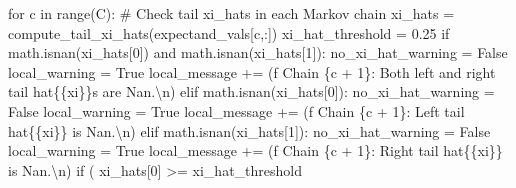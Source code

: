 \documentclass[
  letterpaper,
  DIV=11,
  numbers=noendperiod]{scrartcl}
\newenvironment{Shaded}{\begin{snugshade}}{\end{snugshade}}
\newcommand{\BuiltInTok}[1]{\textcolor[rgb]{0.00,0.23,0.31}{#1}}
\newcommand{\CharTok}[1]{\textcolor[rgb]{0.13,0.47,0.30}{#1}}
\newcommand{\CommentTok}[1]{\textcolor[rgb]{0.37,0.37,0.37}{#1}}
\newcommand{\ControlFlowTok}[1]{\textcolor[rgb]{0.00,0.23,0.31}{#1}}
\newcommand{\DecValTok}[1]{\textcolor[rgb]{0.68,0.00,0.00}{#1}}
\newcommand{\FloatTok}[1]{\textcolor[rgb]{0.68,0.00,0.00}{#1}}
\newcommand{\KeywordTok}[1]{\textcolor[rgb]{0.00,0.23,0.31}{#1}}
\newcommand{\NormalTok}[1]{\textcolor[rgb]{0.00,0.23,0.31}{#1}}
\newcommand{\OperatorTok}[1]{\textcolor[rgb]{0.37,0.37,0.37}{#1}}
\newcommand{\SpecialCharTok}[1]{\textcolor[rgb]{0.37,0.37,0.37}{#1}}
\newcommand{\SpecialStringTok}[1]{\textcolor[rgb]{0.13,0.47,0.30}{#1}}
\newcommand{\StringTok}[1]{\textcolor[rgb]{0.13,0.47,0.30}{#1}}
\newcommand{\VariableTok}[1]{\textcolor[rgb]{0.07,0.07,0.07}{#1}}
\begin{document}
\begin{Shaded}
\begin{Highlighting}[]
    \ControlFlowTok{for}\NormalTok{ c }\KeywordTok{in} \BuiltInTok{range}\NormalTok{(C):}
      \CommentTok{\# Check tail xi\_hats in each Markov chain}
\NormalTok{      xi\_hats }\OperatorTok{=}\NormalTok{ compute\_tail\_xi\_hats(expectand\_vals[c,:])}
\NormalTok{      xi\_hat\_threshold }\OperatorTok{=} \FloatTok{0.25}
      \ControlFlowTok{if}\NormalTok{ math.isnan(xi\_hats[}\DecValTok{0}\NormalTok{]) }\KeywordTok{and}\NormalTok{ math.isnan(xi\_hats[}\DecValTok{1}\NormalTok{]):}
\NormalTok{        no\_xi\_hat\_warning }\OperatorTok{=} \VariableTok{False}
\NormalTok{        local\_warning }\OperatorTok{=} \VariableTok{True}
\NormalTok{        local\_message }\OperatorTok{+=}\NormalTok{ (}\SpecialStringTok{f\textquotesingle{}  Chain }\SpecialCharTok{\{}\NormalTok{c }\OperatorTok{+} \DecValTok{1}\SpecialCharTok{\}}\SpecialStringTok{: Both left and right tail \textquotesingle{}}
                          \StringTok{\textquotesingle{}hat}\SpecialCharTok{\{\{}\StringTok{xi}\SpecialCharTok{\}\}}\StringTok{s are Nan.}\CharTok{\textbackslash{}n}\StringTok{\textquotesingle{}}\NormalTok{)}
      \ControlFlowTok{elif}\NormalTok{ math.isnan(xi\_hats[}\DecValTok{0}\NormalTok{]):}
\NormalTok{        no\_xi\_hat\_warning }\OperatorTok{=} \VariableTok{False}
\NormalTok{        local\_warning }\OperatorTok{=} \VariableTok{True}
\NormalTok{        local\_message }\OperatorTok{+=}\NormalTok{ (}\SpecialStringTok{f\textquotesingle{}  Chain }\SpecialCharTok{\{}\NormalTok{c }\OperatorTok{+} \DecValTok{1}\SpecialCharTok{\}}\SpecialStringTok{: Left tail \textquotesingle{}}
                          \StringTok{\textquotesingle{}hat}\SpecialCharTok{\{\{}\StringTok{xi}\SpecialCharTok{\}\}}\StringTok{ is Nan.}\CharTok{\textbackslash{}n}\StringTok{\textquotesingle{}}\NormalTok{)}
      \ControlFlowTok{elif}\NormalTok{ math.isnan(xi\_hats[}\DecValTok{1}\NormalTok{]):}
\NormalTok{        no\_xi\_hat\_warning }\OperatorTok{=} \VariableTok{False}
\NormalTok{        local\_warning }\OperatorTok{=} \VariableTok{True}
\NormalTok{        local\_message }\OperatorTok{+=}\NormalTok{ (}\SpecialStringTok{f\textquotesingle{}  Chain }\SpecialCharTok{\{}\NormalTok{c }\OperatorTok{+} \DecValTok{1}\SpecialCharTok{\}}\SpecialStringTok{: Right tail \textquotesingle{}}
                          \StringTok{\textquotesingle{}hat}\SpecialCharTok{\{\{}\StringTok{xi}\SpecialCharTok{\}\}}\StringTok{ is Nan.}\CharTok{\textbackslash{}n}\StringTok{\textquotesingle{}}\NormalTok{)}
      \ControlFlowTok{if}\NormalTok{ (    xi\_hats[}\DecValTok{0}\NormalTok{] }\OperatorTok{\textgreater{}=}\NormalTok{ xi\_hat\_threshold }

\end{Highlighting}
\end{Shaded}
\end{document}
